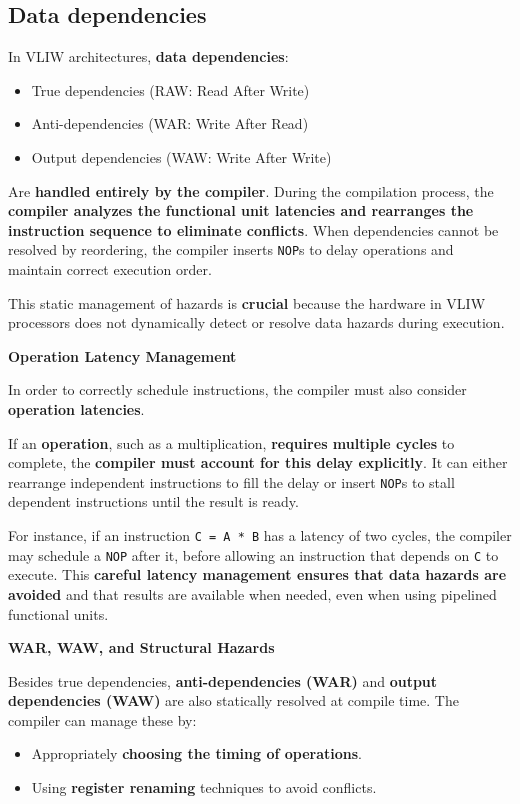 \subsection{Data dependencies}

In VLIW architectures, \textbf{data dependencies}:
\begin{itemize}
    \item True dependencies (RAW: Read After Write)
    \item Anti-dependencies (WAR: Write After Read)
    \item Output dependencies (WAW: Write After Write)
\end{itemize}
Are \textbf{handled entirely by the compiler}. During the compilation process, the \textbf{compiler analyzes the functional unit latencies and rearranges the instruction sequence to eliminate conflicts}. When dependencies cannot be resolved by reordering, the compiler inserts \texttt{NOP}s to delay operations and maintain correct execution order.

\highspace
This static management of hazards is \textbf{crucial} because the hardware in VLIW processors does not dynamically detect or resolve data hazards during execution.

\highspace
\begin{flushleft}
    \textcolor{Green3}{ \textbf{Operation Latency Management}}
\end{flushleft}
In order to correctly schedule instructions, the compiler must also consider \textbf{operation latencies}.

\highspace
If an \textbf{operation}, such as a multiplication, \textbf{requires multiple cycles} to complete, the \textbf{compiler must account for this delay explicitly}. It can either rearrange independent instructions to fill the delay or insert \texttt{NOP}s to stall dependent instructions until the result is ready.

\highspace
For instance, if an instruction \texttt{C = A * B} has a latency of two cycles, the compiler may schedule a \texttt{NOP} after it, before allowing an instruction that depends on \texttt{C} to execute. This \textbf{careful latency management ensures that data hazards are avoided} and that results are available when needed, even when using pipelined functional units.

\highspace
\begin{flushleft}
    \textcolor{Red2}{ \textbf{WAR, WAW, and Structural Hazards}}
\end{flushleft}
Besides true dependencies, \textbf{anti-dependencies (WAR)} and \textbf{output dependencies (WAW)} are also statically resolved at compile time. The compiler can manage these by:
\begin{itemize}[label=\textcolor{Green3}{}]
    \item Appropriately \textbf{choosing the timing of operations}.
    \item Using \textbf{register renaming} techniques to avoid conflicts.
\end{itemize}


